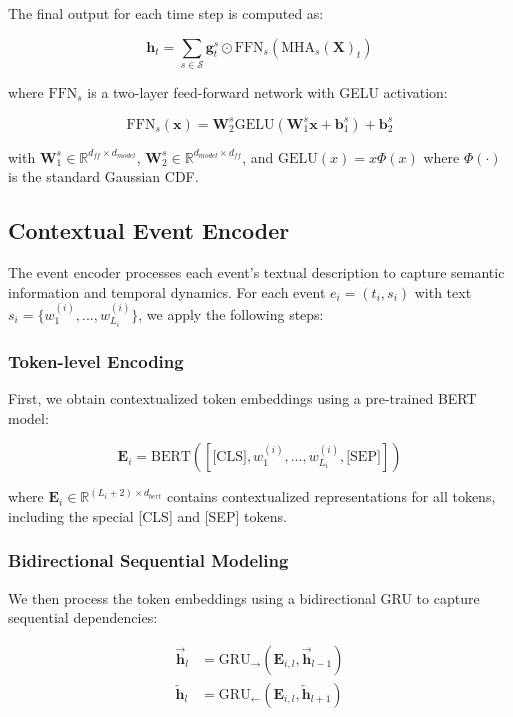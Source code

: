 The final output for each time step is computed as:

\begin{equation}
    \mathbf{h}_t = \sum_{s \in \mathcal{S}} \mathbf{g}_t^s \odot \text{FFN}_s(\text{MHA}_s(\mathbf{X})_t)
\end{equation}

where $\text{FFN}_s$ is a two-layer feed-forward network with GELU activation:

\begin{equation}
    \text{FFN}_s(\mathbf{x}) = \mathbf{W}_2^s\text{GELU}(\mathbf{W}_1^s\mathbf{x} + \mathbf{b}_1^s) + \mathbf{b}_2^s
\end{equation}

with $\mathbf{W}_1^s \in \mathbb{R}^{d_{ff} \times d_{model}}$, $\mathbf{W}_2^s \in \mathbb{R}^{d_{model} \times d_{ff}}$, and $\text{GELU}(x) = x\Phi(x)$ where $\Phi(\cdot)$ is the standard Gaussian CDF.

\subsection{Contextual Event Encoder}
The event encoder processes each event's textual description to capture semantic information and temporal dynamics. For each event $e_i = (t_i, s_i)$ with text $s_i = \{w_1^{(i)}, ..., w_{L_i}^{(i)}\}$, we apply the following steps:

\subsubsection{Token-level Encoding}
First, we obtain contextualized token embeddings using a pre-trained BERT model:

\begin{equation}
    \mathbf{E}_i = \text{BERT}([\text{[CLS]}, w_1^{(i)}, ..., w_{L_i}^{(i)}, \text{[SEP]}])
\end{equation}

where $\mathbf{E}_i \in \mathbb{R}^{(L_i+2) \times d_{bert}}$ contains contextualized representations for all tokens, including the special [CLS] and [SEP] tokens.

\subsubsection{Bidirectional Sequential Modeling}
We then process the token embeddings using a bidirectional GRU to capture sequential dependencies:

\begin{align}
    \overrightarrow{\mathbf{h}}_l &= \text{GRU}_\rightarrow(\mathbf{E}_{i,l}, \overrightarrow{\mathbf{h}}_{l-1}) \\
    \overleftarrow{\mathbf{h}}_l &= \text{GRU}_\leftarrow(\mathbf{E}_{i,l}, \overleftarrow{\mathbf{h}}_{l+1})
\end{align}

